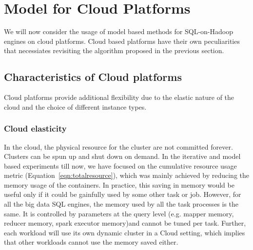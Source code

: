 \section{Model for Cloud Platforms}
\label{sec:modelcloud}
We will now consider the usage of model based methods for SQL-on-Hadoop engines on cloud platforms. Cloud based platforms have their own peculiarities that necessiates revisiting the algorithm proposed in the previous section. 

\subsection{Characteristics of Cloud platforms}
Cloud platforms provide additional flexibility due to the elastic nature of the cloud and the choice of different instance types.

\noindent\subsubsection*{Cloud elasticity}
 In the cloud, the physical resource for the cluster are not committed forever. Clusters can be spun up and shut down on demand. In the iterative and model based experiments till now, we have focused on the cumulative resource usage metric (Equation~\ref{eqn:totalresource}), which was mainly achieved by reducing the memory usage of the containers. 
In practice, this saving in memory would be useful only if it could be gainfully used by some other task or job. However, for all the big data SQL engines, the memory used by all the task processes is the same. It is controlled by parameters at the query level (e.g. mapper memory, reducer memory, spark executor memory)and cannot be tuned per task.
Further, each workload will use its own dynamic cluster in a Cloud setting, which implies that other workloads cannot use the memory saved either. 

